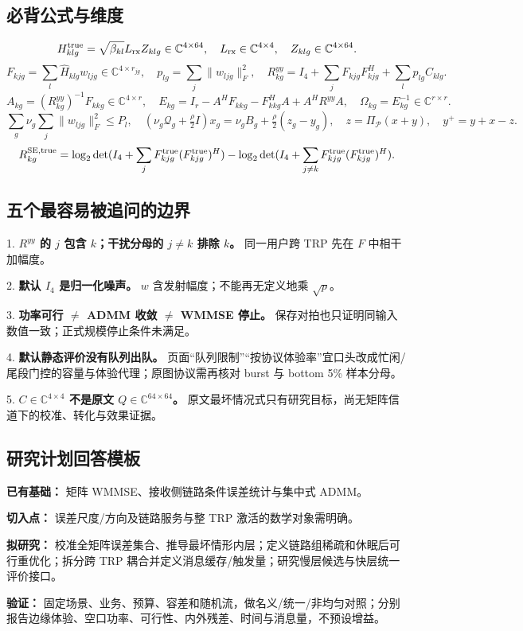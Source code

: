 \documentclass[11pt,a4paper]{ctexart}
\begin{document}
\subsection*{必背公式与维度}

\[
H^{\rm true}_{klg}=\sqrt{\beta_{kl}}L_{\rm rx}Z_{klg}\in\mathbb C^{4\times64},
\quad L_{\rm rx}\in\mathbb C^{4\times4},
\quad Z_{klg}\in\mathbb C^{4\times64}.
\]
\[
F_{kjg}=\sum_l\widehat H_{klg}w_{ljg}\in\mathbb C^{4\times r_{jg}},
\quad p_{lg}=\sum_j\|w_{ljg}\|_F^2,
\quad R^{yy}_{kg}=I_4+\sum_jF_{kjg}F_{kjg}^H+\sum_lp_{lg}C_{klg}.
\]
\[
A_{kg}=(R^{yy}_{kg})^{-1}F_{kkg}\in\mathbb C^{4\times r},
\quad E_{kg}=I_r-A^HF_{kkg}-F_{kkg}^HA+A^HR^{yy}A,
\quad\Omega_{kg}=E_{kg}^{-1}\in\mathbb C^{r\times r}.
\]
\[
\sum_g\nu_g\sum_j\|w_{ljg}\|_F^2\le P_l,
\quad(\nu_g\mathcal Q_g+\tfrac\rho2 I)x_g=\nu_g B_g+\tfrac\rho2(z_g-y_g),
\quad z=\Pi_{\mathcal P}(x+y),\quad y^+=y+x-z.
\]
\[
R_{kg}^{\rm SE,true}=\log_2\det(I_4+\sum_jF^{\rm true}_{kjg}(F^{\rm true}_{kjg})^H)
-\log_2\det(I_4+\sum_{j\ne k}F^{\rm true}_{kjg}(F^{\rm true}_{kjg})^H).
\]

\subsection*{五个最容易被追问的边界}

1. \textbf{$R^{yy}$ 的 $j$ 包含 $k$；干扰分母的 $j\ne k$ 排除 $k$。} 同一用户跨 TRP 先在 $F$ 中相干加幅度。\par
2. \textbf{默认 $I_4$ 是归一化噪声。} $w$ 含发射幅度；不能再无定义地乘 $\sqrt p$。\par
3. \textbf{功率可行 $\ne$ ADMM 收敛 $\ne$ WMMSE 停止。} 保存对拍也只证明同输入数值一致；正式规模停止条件未满足。\par
4. \textbf{默认静态评价没有队列出队。} 页面“队列限制”“按协议体验率”宜口头改成忙闲/尾段门控的容量与体验代理；原图协议需再核对 burst 与 bottom 5\% 样本分母。\par
5. \textbf{$C\in\mathbb C^{4\times4}$ 不是原文 $Q\in\mathbb C^{64\times64}$。} 原文最坏情况式只有研究目标，尚无矩阵信道下的校准、转化与效果证据。\par

\subsection*{研究计划回答模板}

\textbf{已有基础：} 矩阵 WMMSE、接收侧链路条件误差统计与集中式 ADMM。\par
\textbf{切入点：} 误差尺度/方向及链路服务与整 TRP 激活的数学对象需明确。\par
\textbf{拟研究：} 校准全矩阵误差集合、推导最坏情形内层；定义链路组稀疏和休眠后可行重优化；拆分跨 TRP 耦合并定义消息缓存/触发量；研究慢层候选与快层统一评价接口。\par
\textbf{验证：} 固定场景、业务、预算、容差和随机流，做名义/统一/非均匀对照；分别报告边缘体验、空口功率、可行性、内外残差、时间与消息量，不预设增益。\par
\end{document}
